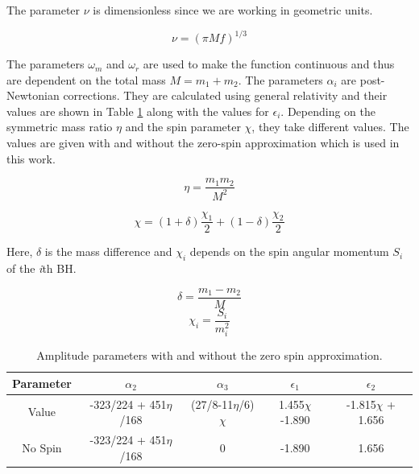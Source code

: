The parameter $\nu$ is dimensionless since we are working in geometric units.

\begin{equation}
    \nu=(\pi M f)^{1/3}
\end{equation}

The parameters $\omega_m$ and $\omega_r$ are used to make the function continuous and thus are dependent on the total mass $M=m_1+m_2$. The parameters $\alpha_i$ are post-Newtonian corrections. They are calculated using general relativity and their values are shown in Table \ref{amplitude_param} along with the values for $\epsilon_i$. Depending on the symmetric mass ratio $\eta$ and the spin parameter $\chi$, they take different values. The values are given with and without the zero-spin approximation which is used in this work.

\begin{equation}
    \eta=\frac{m_1 m_2}{M^2}
\end{equation}

\begin{equation}
    \chi = (1+\delta)\frac{\chi_1}{2} + (1-\delta)\frac{\chi_2}{2}
\end{equation}

Here, $\delta$ is the mass difference and $\chi_i$ depends on the spin angular momentum $S_i$ of the \textit{i}th BH.

\begin{equation}
    \delta=\frac{m_1-m_2}{M}
\end{equation}
\begin{equation}
    \chi_i=\frac{S_i}{m_i^2}
\end{equation}

\begin{table}[h]
    \begin{center}
        \begin{tabular}{ c | c | c | c | c}
            Parameter & $\alpha_2$ & $\alpha_3$ & $\epsilon_1$ & $\epsilon_2$ \\
            \hline
            Value & -323/224 + 451$\eta$/168 & (27/8-11$\eta$/6)$\chi$ & 1.455$\chi$-1.890 & -1.815$\chi$ + 1.656\\
            \hline
            No Spin & -323/224 +  451$\eta$/168 & 0 & -1.890 & 1.656 
        \end{tabular}
        \caption{Amplitude parameters with and without the zero spin approximation.}
        \label{amplitude_param}
    \end{center}
\end{table}

